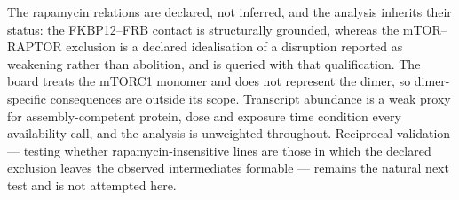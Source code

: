 The rapamycin relations are declared, not inferred, and the analysis inherits
their status: the FKBP12--FRB contact is structurally grounded, whereas the
mTOR--RAPTOR exclusion is a declared idealisation of a disruption reported as
weakening rather than abolition, and is queried with that qualification. The
board treats the mTORC1 monomer and does not represent the dimer, so
dimer-specific consequences are outside its scope. Transcript abundance is a
weak proxy for assembly-competent protein, dose and exposure time condition
every availability call, and the analysis is unweighted throughout.
Reciprocal validation --- testing whether rapamycin-insensitive lines are those
in which the declared exclusion leaves the observed intermediates formable ---
remains the natural next test and is not attempted here.
